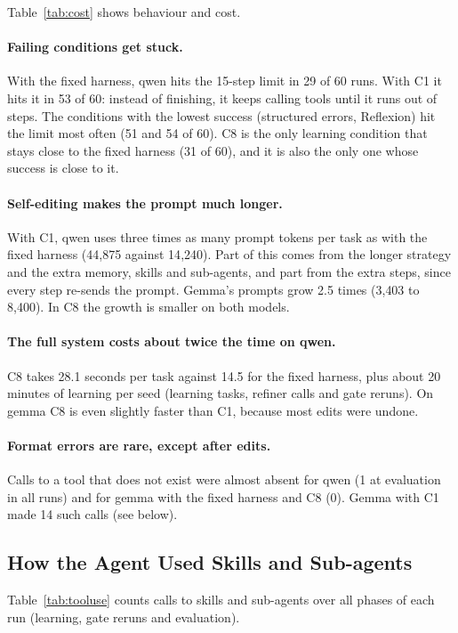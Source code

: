 Table~\ref{tab:cost} shows behaviour and cost.

\paragraph{Failing conditions get stuck.}
With the fixed harness, qwen hits the 15-step limit in 29 of 60 runs. With C1 it hits it in 53 of
60: instead of finishing, it keeps calling tools until it runs out of steps. The conditions with the
lowest success (structured errors, Reflexion) hit the limit most often (51 and 54 of 60). C8 is the
only learning condition that stays close to the fixed harness (31 of 60), and it is also the only
one whose success is close to it.

\paragraph{Self-editing makes the prompt much longer.}
With C1, qwen uses three times as many prompt tokens per task as with the fixed harness (44{,}875
against 14{,}240). Part of this comes from the longer strategy and the extra memory, skills and
sub-agents, and part from the extra steps, since every step re-sends the prompt. Gemma's prompts
grow 2.5 times (3{,}403 to 8{,}400). In C8 the growth is smaller on both models.

\paragraph{The full system costs about twice the time on qwen.}
C8 takes 28.1 seconds per task against 14.5 for the fixed harness, plus about 20 minutes of learning
per seed (learning tasks, refiner calls and gate reruns). On gemma C8 is even slightly faster than C1, because most
edits were undone.

\paragraph{Format errors are rare, except after edits.}
Calls to a tool that does not exist were almost absent for qwen (1 at evaluation in all runs) and
for gemma with the fixed harness and C8 (0). Gemma with C1 made 14 such calls (see below).

\subsection{How the Agent Used Skills and Sub-agents}

Table~\ref{tab:tooluse} counts calls to skills and sub-agents over all phases of each run
(learning, gate reruns and evaluation).

